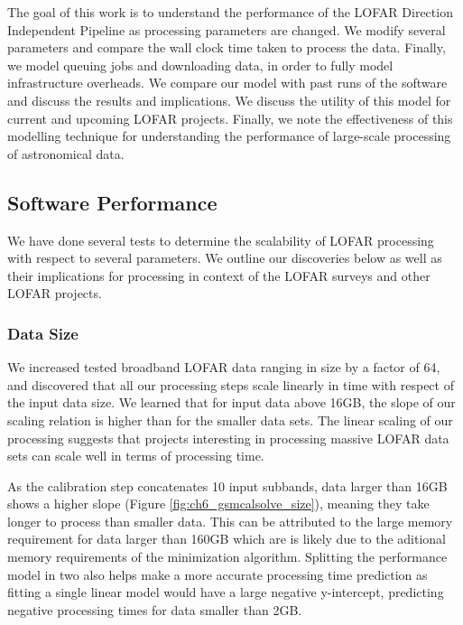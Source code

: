 
The goal of this work is to understand the performance of the LOFAR Direction Independent Pipeline as processing parameters are changed. We modify several parameters and compare the wall clock time taken to process the data. Finally, we model queuing jobs and downloading data, in order to fully model infrastructure overheads. We compare our model with past runs of the software and discuss the results and implications. We discuss the utility of this model for current and upcoming LOFAR projects. Finally, we note the effectiveness of this modelling technique for understanding the performance of large-scale processing of astronomical data.

\subsection{Software Performance}

We have done several tests to determine the scalability of LOFAR processing with respect to several parameters. We outline our discoveries below as well as their implications for processing in context of the LOFAR surveys and other LOFAR projects. 

\subsubsection{Data Size}
We increased tested broadband LOFAR data ranging in size by a factor of 64, and discovered that all our processing steps scale linearly in time with respect of the input data size. We learned that for input data above 16GB, the slope of our scaling relation is higher than for the smaller data sets. The linear scaling of our processing suggests that projects interesting in processing massive LOFAR data sets can scale well in terms of processing time. 

As the calibration step concatenates 10 input subbands, data larger than 16GB shows a higher slope (Figure \ref{fig:ch6_gsmcalsolve_size}), meaning they take longer to process than smaller data. This can be attributed to the large memory requirement for data larger than 160GB which are is likely due to the aditional memory requirements of the minimization algorithm.  Splitting the performance model in two also helps make a more accurate processing time prediction as fitting a single linear model would have a large negative y-intercept, predicting negative processing times for data smaller than 2GB. 

